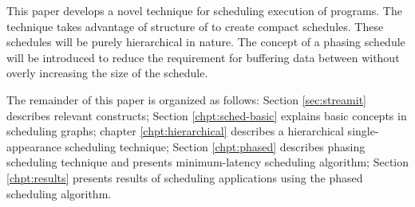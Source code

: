 This paper develops a novel technique for scheduling execution of
{\StreamIt} programs. The technique takes advantage of structure
of {\StreamIt} to create compact schedules. These schedules will
be purely hierarchical in nature. The concept of a phasing
schedule will be introduced to reduce the requirement for
buffering data between {\filters} without overly increasing the
size of the schedule.

\begin{comment}
The contributions of this thesis are:
\begin{itemize} \item
hierarchical scheduling of streaming application, a concept
enabled by {\StreamIt} language, \item first formal handling of
\SDF graphs with peeking, \item novel phasing scheduling
technique, \item a minimal latency schedule using hierarchical
phases, \item novel \SDF program abstraction called the
information buffering model that simplifies information latency
analysis, \item a solution to scheduling of {\StreamIt} programs
with latency constraints.
\end{itemize}
\end{comment}

The remainder of this paper is organized as follows: Section
\ref{sec:streamit} describes relevant {\StreamIt} constructs;
Section \ref{chpt:sched-basic} explains basic concepts in
scheduling {\StreamIt} graphs; chapter \ref{chpt:hierarchical}
describes a hierarchical single-appearance scheduling technique;
Section \ref{chpt:phased} describes phasing scheduling technique
and presents minimum-latency scheduling algorithm; Section
\ref{chpt:results} presents results of scheduling applications
using the phased scheduling algorithm.
